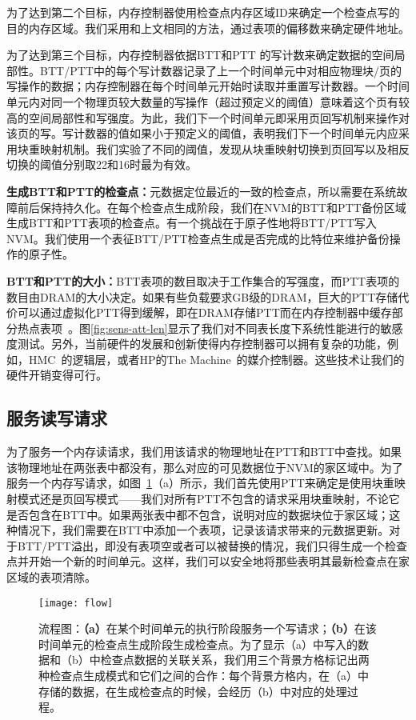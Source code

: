 为了达到第二个目标，内存控制器使用检查点内存区域ID来确定一个检查点写的目的内存区域。我们采用和上文相同的方法，通过表项的偏移数来确定硬件地址。 

为了达到第三个目标，内存控制器依据BTT和PTT 的写计数来确定数据的空间局部性。BTT/PTT中的每个写计数器记录了上一个时间单元中对相应物理块/页的写操作的数据；内存控制器在每个时间单元开始时读取并重置写计数器。一个时间单元内对同一个物理页较大数量的写操作（超过预定义的阈值）意味着这个页有较高的空间局部性和写强度。为此，我们下一个时间单元即采用页回写机制来操作对该页的写。写计数器的值如果小于预定义的阈值，表明我们下一个时间单元内应采用块重映射机制。我们实验了不同的阈值，发现从块重映射切换到页回写以及相反切换的阈值分别取22和16时最为有效。
 
\textbf{生成BTT和PTT的检查点：}元数据定位最近的一致的检查点，所以需要在系统故障前后保持持久化。在每个检查点生成阶段，我们在NVM的BTT和PTT备份区域生成BTT和PTT表项的检查点。有一个挑战在于原子性地将BTT/PTT写入NVM。我们使用一个表征BTT/PTT检查点生成是否完成的比特位来维护备份操作的原子性。 

\textbf{BTT和PTT的大小：}BTT表项的数目取决于工作集合的写强度，而PTT表项的数目由DRAM的大小决定。如果有些负载要求GB级的DRAM，巨大的PTT存储代价可以通过虚拟化PTT得到缓解，即在DRAM存储PTT而在内存控制器中缓存部分热点表项~\cite{Meza2012, Yoon2010, Burcea2008}。图\ref{fig:sens-att-len}显示了我们对不同表长度下系统性能进行的敏感度测试。另外，当前硬件的发展和创新使得内存控制器可以拥有复杂的功能，例如，HMC~\cite{HMC:2011}的逻辑层，或者HP的The Machine~\cite{TheMachine:2015}的媒介控制器。这些技术让我们的硬件开销变得可行。

\subsection{服务读写请求}

为了服务一个内存读请求，我们用该请求的物理地址在PTT和BTT中查找。如果该物理地址在两张表中都没有，那么对应的可见数据位于NVM的家区域中。为了服务一个内存写请求，如图~\ref{fig:flow}（a）所示，我们首先使用PTT来确定是使用块重映射模式还是页回写模式——我们对所有PTT不包含的请求采用块重映射，不论它是否包含在BTT中。如果两张表中都不包含，说明对应的数据块位于家区域；这种情况下，我们需要在BTT中添加一个表项，记录该请求带来的元数据更新。对于BTT/PTT溢出，即没有表项空或者可以被替换的情况，我们只得生成一个检查点并开始一个新的时间单元。这样，我们可以安全地将那些表明其最新检查点在家区域的表项清除。

\begin{figure}[!h]
\centering
\texttt{[image: flow]}
\caption{流程图：\textbf{（a）}在某个时间单元的执行阶段服务一个写请求；\textbf{（b）}在该时间单元的检查点生成阶段生成检查点。为了显示（a）中写入的数据和（b）中检查点数据的关联关系，我们用三个背景方格标记出两种检查点生成模式和它们之间的合作：每个背景方格内，在（a）中存储的数据，在生成检查点的时候，会经历（b）中对应的处理过程。}
\label{fig:flow}
\end{figure}

